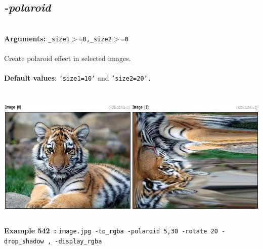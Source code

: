 \documentclass[a4paper,11pt,twoside]{book}
\begin{document}
\subsection{\emph{-polaroid} }\vspace*{-0.5em}
~\\\textbf{Arguments: } 
{\small \texttt{\_size1$>$=0,\_size2$>$=0}}\\~\\
Create polaroid effect in selected images.
~\\~\\\textbf{Default values}: {\small \texttt{'size1=10'} and \texttt{'size2=20'.}}
\begin{center}\includegraphics[keepaspectratio=true,height=7cm,width=\textwidth]{img/gmic_def542.jpg}\\
{\footnotesize \textbf{Example 542~:} \texttt{image.jpg -to\_rgba -polaroid 5,30 -rotate 20 -drop\_shadow , -display\_rgba}}
\end{center}
\end{document}
